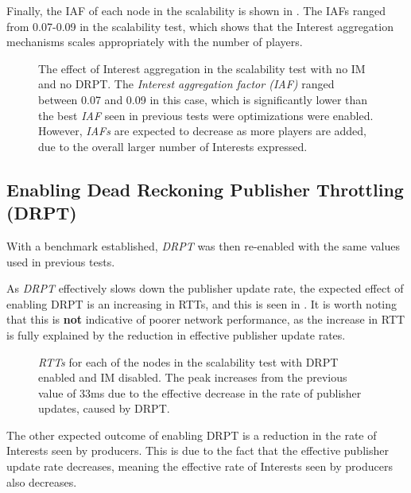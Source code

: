 Finally, the IAF of each node in the scalability is shown in . The IAFs ranged from 0.07-0.09 in the scalability test, which shows that the Interest aggregation mechanisms scales appropriately with the number of players. 

\begin{figure}[H]
    \centering
    \caption{The effect of Interest aggregation in the scalability test with no IM and no DRPT. The \textit{Interest aggregation factor (IAF)} ranged between 0.07 and 0.09 in this case, which is significantly lower than the best \textit{IAF} seen in previous tests were optimizations were enabled. However, \textit{IAFs} are expected to decrease as more players are added, due to the overall larger number of Interests expressed.}
    \label{fig:eval:no-im-no-dr:int-agg}
\end{figure}



\subsection{Enabling Dead Reckoning Publisher Throttling (DRPT)}
With a benchmark established, \textit{DRPT} was then re-enabled with the same values used in previous tests. 

As \textit{DRPT} effectively slows down the publisher update rate, the expected effect of enabling DRPT is an increasing in RTTs, and this is seen in . It is worth noting that this is \textbf{not} indicative of poorer network performance, as the increase in RTT is fully explained by the reduction in effective publisher update rates.

\begin{figure}[H]
    \centering
    \caption{\textit{RTTs} for each of the nodes in the scalability test with DRPT enabled and IM disabled. The peak increases from the previous value of 33ms due to the effective decrease in the rate of publisher updates, caused by DRPT.}
    \label{fig:eval:dr:agg-packet-times}
\end{figure}



The other expected outcome of enabling DRPT is a reduction in the rate of Interests seen by producers. This is due to the fact that the effective publisher update rate decreases, meaning the effective rate of Interests seen by producers also decreases. 

